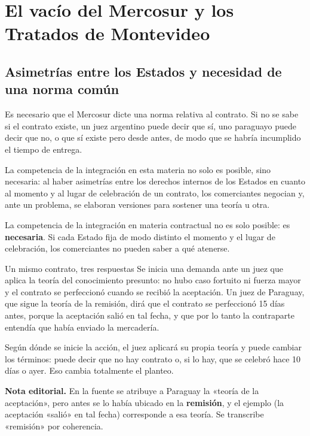 \documentclass[12pt,oneside]{book}
\begin{document}
\chapter[Mercosur y Tratados de Montevideo]{El vacío del Mercosur y los Tratados de Montevideo}

\section{Asimetrías entre los Estados y necesidad de una norma común}

Es necesario que el Mercosur dicte una norma relativa al contrato. Si no se sabe si el contrato existe, un juez argentino puede decir que sí, uno paraguayo puede decir que no, o que sí existe pero desde antes, de modo que se habría incumplido el tiempo de entrega.

La competencia de la integración en esta materia no solo es posible, sino necesaria: al haber asimetrías entre los derechos internos de los Estados en cuanto al momento y al lugar de celebración de un contrato, los comerciantes negocian y, ante un problema, se elaboran versiones para sostener una teoría u otra.

\begin{important}
La competencia de la integración en materia contractual no es solo posible: es \textbf{necesaria}. Si cada Estado fija de modo distinto el momento y el lugar de celebración, los comerciantes no pueden saber a qué atenerse.
\end{important}

\begin{example}{Un mismo contrato, tres respuestas}
Se inicia una demanda ante un juez que aplica la teoría del conocimiento presunto: no hubo caso fortuito ni fuerza mayor y el contrato se perfeccionó cuando se recibió la aceptación. Un juez de Paraguay, que sigue la teoría de la remisión, dirá que el contrato se perfeccionó 15 días antes, porque la aceptación salió en tal fecha, y que por lo tanto la contraparte entendía que había enviado la mercadería.

Según dónde se inicie la acción, el juez aplicará su propia teoría y puede cambiar los términos: puede decir que no hay contrato o, si lo hay, que se celebró hace 10 días o ayer. Eso cambia totalmente el planteo.
\end{example}

\begin{note}
\textbf{Nota editorial.} En la fuente se atribuye a Paraguay la «teoría de la aceptación», pero antes se lo había ubicado en la \textbf{remisión}, y el ejemplo (la aceptación «salió» en tal fecha) corresponde a esa teoría. Se transcribe «remisión» por coherencia.
\end{note}
\end{document}
